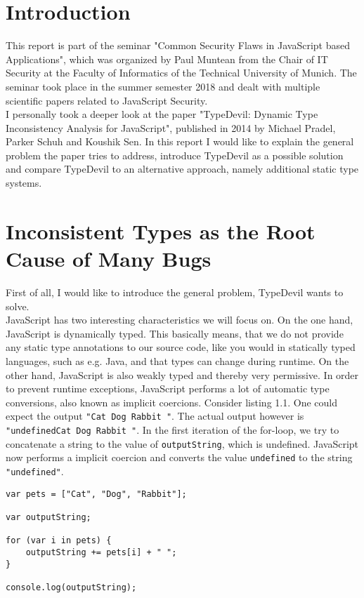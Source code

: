 \documentclass[runningheads,a4paper]{llncs}
\begin{document}
\section{Introduction}

This report is part of the seminar "Common Security Flaws in JavaScript based Applications", which was organized by Paul Muntean from the Chair of IT Security at the Faculty of Informatics of the Technical University of Munich.
The seminar took place in the summer semester 2018 and dealt with multiple scientific papers related to JavaScript Security. \\
I personally took a deeper look at the paper "TypeDevil: Dynamic Type Inconsistency Analysis for JavaScript", published in 2014 by Michael Pradel, Parker Schuh and Koushik Sen.
In this report I would like to explain the general problem the paper tries to address, introduce TypeDevil as a possible solution and compare TypeDevil to an alternative approach, namely additional static type systems. 

\section{Inconsistent Types as the Root Cause of Many Bugs}
First of all, I would like to introduce the general problem, TypeDevil wants to solve. \\
JavaScript has two interesting characteristics we will focus on. 
On the one hand, JavaScript is dynamically typed. This basically means, that we do not provide any static type annotations to our source code, like you would in statically typed languages, such as e.g. Java, and that types can change during runtime.
On the other hand, JavaScript is also weakly typed and thereby very permissive. In order to prevent runtime exceptions, JavaScript performs a lot of automatic type conversions, also known as implicit coercions.
Consider listing 1.1. One could expect the output \lstinline[columns=fixed]{"Cat Dog Rabbit "}.
The actual output however is \lstinline[columns=fixed]{"undefinedCat Dog Rabbit "}. 
In the first iteration of the for-loop, we try to concatenate a string to the value of \lstinline[columns=fixed]{outputString}, which is undefined. 
JavaScript now performs a implicit coercion and converts the value \lstinline[columns=fixed]{undefined} to the string \lstinline[columns=fixed]{"undefined"}.

\lstset{language=javascript}
\begin{minipage}{\linewidth}
\begin{lstlisting}[frame=single, caption=Implicit Coercions]
var pets = ["Cat", "Dog", "Rabbit"];

var outputString;

for (var i in pets) {
    outputString += pets[i] + " ";
}

console.log(outputString);
\end{lstlisting}
\end{minipage}
\end{document}

